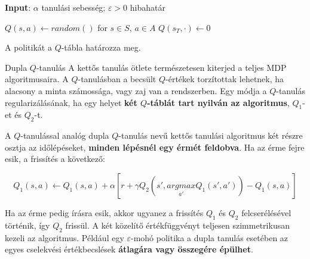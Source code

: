 \documentclass[english, aspectratio=169]{beamer}
\begin{document}
\begin{frame}{}
\begin{algorithm}[H]
\caption{$Q$-tanulás algoritmusa $\pi \approx \pi_*$ megbecslésére}
\SetAlgoLined
\textbf{Input}: $\alpha$ tanulási sebesség; $\varepsilon > 0$ hibahatár\par
$Q(s,a) \leftarrow random()$ for $s \in S$, $a \in A$
$Q(s_T,\cdot) \leftarrow 0$
\end{algorithm}
A politikát a $Q$-tábla határozza meg.
\end{frame}

\begin{frame}{Dupla $Q$-tanulás}
A kettős tanulás ötlete természetesen kiterjed a teljes MDP algoritmusaira. A $Q$-tanulásban a becsült $Q$-értékek torzítottak lehetnek, ha alacsony a minta számossága, vagy zaj van a rendszerben. Egy módja a $Q$-tanulás regularizálásának, ha egy helyet\textbf{ két $Q$-táblát tart nyilván az algoritmus}, $Q_1$-et és $Q_2$-t.\par\smallskip
A $Q$-tanulással analóg dupla $Q$-tanulás nevű kettős tanulási algoritmus két részre osztja az időlépéseket, \textbf{minden lépésnél egy érmét feldobva}. Ha az érme fejre esik, a frissítés a következő:
\begin{block}{}
\[
Q_1(s,a) \leftarrow Q_1(s,a) + \alpha \left[ r + \gamma Q_2(s', \underset{a'}{argmax} Q_1(s',a')) - Q_1(s,a) \right]
\]
\end{block}
Ha az érme pedig írásra esik, akkor ugyanez a frissítés $Q_1$ és $Q_2$ felcserélésével történik, így $Q_2$ frissül. A két közelítő értékfüggvényt teljesen szimmetrikusan kezeli az algoritmus. Például egy $\varepsilon$-mohó politika a dupla tanulás esetében az egyes cselekvési értékbecslések \textbf{átlagára vagy összegére épülhet}.
\end{frame}
\end{document}

